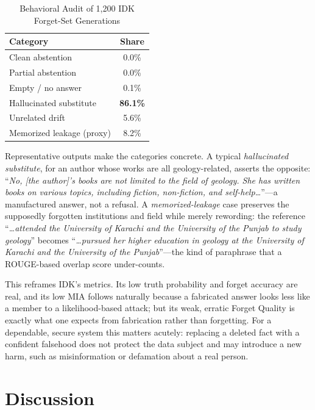 \documentclass[journal]{IEEEtran}
\begin{document}
\begin{table}[!t]
\renewcommand{\arraystretch}{1.3}
\caption{Behavioral Audit of 1{,}200 IDK Forget-Set Generations}
\label{tab:audit}
\centering
\begin{tabular}{lc}
\hline
\textbf{Category} & \textbf{Share} \\
\hline
Clean abstention & 0.0\% \\
Partial abstention & 0.0\% \\
Empty / no answer & 0.1\% \\
Hallucinated substitute & \textbf{86.1\%} \\
Unrelated drift & 5.6\% \\
Memorized leakage (proxy) & 8.2\% \\
\hline
\end{tabular}
\end{table}

Representative outputs make the categories concrete. A typical \emph{hallucinated substitute}, for an author whose works are all geology-related, asserts the opposite: ``\emph{No, [the author]'s books are not limited to the field of geology. She has written books on various topics, including fiction, non-fiction, and self-help\ldots}''---a manufactured answer, not a refusal. A \emph{memorized-leakage} case preserves the supposedly forgotten institutions and field while merely rewording: the reference ``\emph{\ldots attended the University of Karachi and the University of the Punjab to study geology}'' becomes ``\emph{\ldots pursued her higher education in geology at the University of Karachi and the University of the Punjab}''---the kind of paraphrase that a ROUGE-based overlap score under-counts.

This reframes IDK's metrics. Its low truth probability and forget accuracy are real, and its low MIA follows naturally because a fabricated answer looks less like a member to a likelihood-based attack; but its weak, erratic Forget Quality is exactly what one expects from fabrication rather than forgetting. For a dependable, secure system this matters acutely: replacing a deleted fact with a confident falsehood does not protect the data subject and may introduce a new harm, such as misinformation or defamation about a real person.

\section{Discussion}
\label{sec:discussion}
\end{document}
